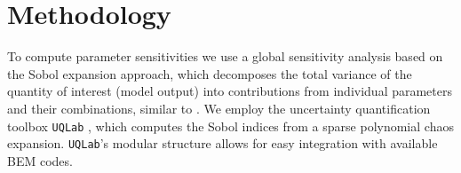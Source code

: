 \documentclass[11pt]{article}
\begin{document}









\section{Methodology}
To compute parameter sensitivities we use a global sensitivity analysis based on the Sobol expansion approach, which decomposes the total variance of the quantity of interest (model output) into contributions from individual parameters and their combinations, similar to \cite{Echeverria2017,Murcia2018,Rinker2016}. We employ the uncertainty quantification toolbox \texttt{UQLab} \cite{uqlab}, which computes the Sobol indices from a sparse polynomial chaos expansion. \texttt{UQLab}'s modular structure allows for easy integration with available BEM codes. 
\end{document}
